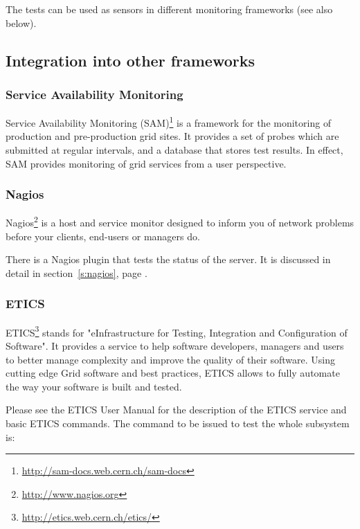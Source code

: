 The tests can be used as sensors in different monitoring frameworks
(see also below).




\subsection{Integration into other frameworks}

\subsubsection{Service Availability Monitoring}

Service Availability Monitoring
(SAM)\footnote{\url{http://sam-docs.web.cern.ch/sam-docs}} is a framework for
the monitoring of production and pre-production grid sites. It provides a set
of probes which are submitted at regular intervals, and a database that stores
test results. In effect, SAM provides monitoring of grid services from a user
perspective.



\subsubsection{Nagios}

Nagios\footnote{\url{http://www.nagios.org}} is a host and service monitor
designed to inform you of network problems before your clients, end-users or
managers do.

There is a Nagios plugin that tests the status of the \LB server. It is discussed in detail in section~\ref{s:nagios}, page \pageref{s:nagios}.


\subsubsection{ETICS}

ETICS\footnote{\url{http://etics.web.cern.ch/etics/}} stands for
"eInfrastructure for Testing, Integration and Configuration of Software". It
provides a service to help software developers, managers and users to better
manage complexity and improve the quality of their software. Using cutting
edge Grid software and best practices, ETICS allows to fully automate
the way your software is built and tested.

Please see the ETICS User Manual \cite{etics_manual} for the description
of the ETICS service and basic ETICS commands. The command to be issued to
test the whole \LB subsystem is:

